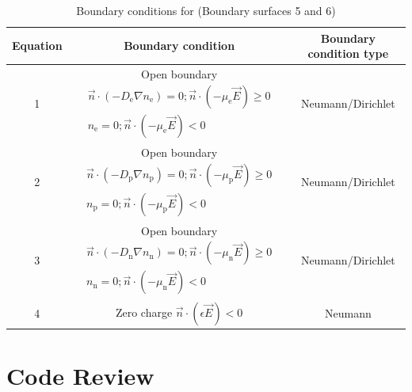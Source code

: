 \documentclass[12pt, a4paper]{report}
\begin{document}
\begin{table}[!h]
    \centering\begin{tabular}{c|c|c}
        Equation & Boundary condition & Boundary condition type\\ \hline
        1 & Open boundary $\begin{array}{c}\vec{n} \cdot\left(-D_{\mathrm{e}} \nabla n_{\mathrm{e}}\right)=0 ; \vec{n} \cdot\left(-\mu_{\mathrm{e}} \vec{E}\right) \geqslant 0 \\ n_{\mathrm{e}}=0 ; \vec{n} \cdot\left(-\mu_{\mathrm{e}} \vec{E}\right)<0\end{array} $ & Neumann/Dirichlet \\ \hline
        2 & Open boundary $\begin{array}{c}\vec{n} \cdot\left(-D_{\mathrm{p}} \nabla n_{\mathrm{p}}\right)=0 ; \vec{n} \cdot\left(-\mu_{\mathrm{p}} \vec{E}\right) \geqslant 0 \\ n_{\mathrm{p}}=0 ; \vec{n} \cdot\left(-\mu_{\mathrm{p}} \vec{E}\right)<0\end{array} $   & Neumann/Dirichlet \\ \hline
        3 & Open boundary $\begin{array}{c}\vec{n} \cdot\left(-D_{\mathrm{n}} \nabla n_{\mathrm{n}}\right)=0 ; \vec{n} \cdot\left(-\mu_{\mathrm{n}} \vec{E}\right) \geqslant 0 \\ n_{\mathrm{n}}=0 ; \vec{n} \cdot\left(-\mu_{\mathrm{n}} \vec{E}\right)<0\end{array} $  & Neumann/Dirichlet\\ \hline
        4 & Zero charge $\vec{n} \cdot\left(\epsilon \vec{E}\right)<0$ & Neumann \\ \hline

    \end{tabular}
    \caption{Boundary conditions for  (Boundary surfaces 5 and 6)}
\end{table}

\section{\bf \large Code Review}
\end{document}
